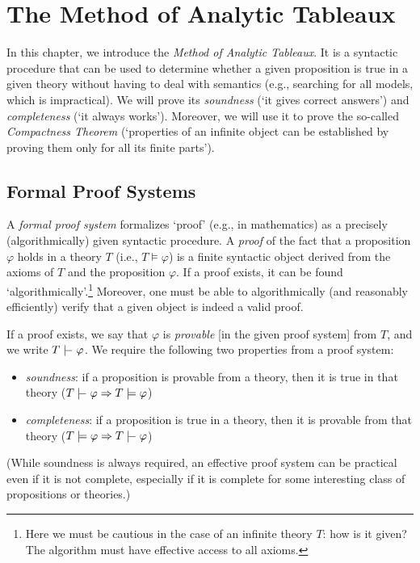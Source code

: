 \chapter{The Method of Analytic Tableaux}
\label{chapter:tableau-method-propositional}

In this chapter, we introduce the \emph{Method of Analytic Tableaux}. It is a syntactic procedure that can be used to determine whether a given proposition is true in a given theory without having to deal with semantics (e.g., searching for all models, which is impractical). We will prove its \emph{soundness} (`it gives correct answers') and \emph{completeness} (`it always works'). Moreover, we will use it to prove the so-called \emph{Compactness Theorem} (`properties of an infinite object can be established by proving them only for all its finite parts').

\section{Formal Proof Systems}

A \emph{formal proof system} formalizes `proof' (e.g., in mathematics) as a precisely (algorithmically) given syntactic procedure. A \emph{proof} of the fact that a proposition $\varphi$ holds in a theory $T$ (i.e., $T \models \varphi$) is a finite syntactic object derived from the axioms of $T$ and the proposition $\varphi$. If a proof exists, it can be found `algorithmically'.\footnote{Here we must be cautious in the case of an infinite theory $T$: how is it given? The algorithm must have effective access to all axioms.} Moreover, one must be able to algorithmically (and reasonably efficiently) verify that a given object is indeed a valid proof.

If a proof exists, we say that $\varphi$ is \emph{provable} [in the given proof system] from $T$, and we write $T \proves \varphi$. We require the following two properties from a proof system:
\begin{itemize}
    \item \emph{soundness}: if a proposition is provable from a theory, then it is true in that theory ($T \proves \varphi \Rightarrow T \models \varphi$)
    \item \emph{completeness}: if a proposition is true in a theory, then it is provable from that theory ($T \models \varphi \Rightarrow T \proves \varphi$)
\end{itemize}
(While soundness is always required, an effective proof system can be practical even if it is not complete, especially if it is complete for some interesting class of propositions or theories.)

